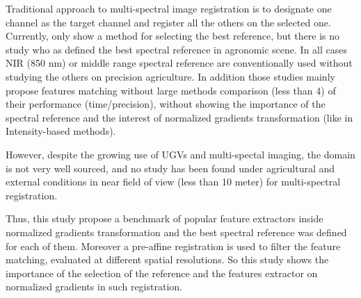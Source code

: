 \documentclass[../thesis.tex]{subfiles}
\begin{document}
	\par Traditional approach to multi-spectral image registration is to designate one channel as
	the target channel and register all the others on the selected one.
	Currently, only \cite{DantasDiasJunior} show a method for selecting the best reference,
	but there is no study who as defined the best spectral reference in agronomic scene.
	In all cases NIR (850 nm) or middle range spectral reference are conventionally used without studying the others on precision agriculture.
	In addition those studies mainly propose features matching without large methods comparison \cite{DantasDiasJunior}(less than 4) of their performance (time/precision),
	without showing the importance of the spectral reference and the interest of normalized gradients transformation (like in Intensity-based methods).
	
	\par However, despite the growing use of UGVs and multi-spectal imaging, the domain is not very well sourced,
	and no study has been found under agricultural and external conditions in near field of view (less than 10 meter) for multi-spectral registration.
	
	\par Thus, this study propose a benchmark of popular feature extractors inside normalized gradients transformation
	and the best spectral reference was defined for each of them.
	Moreover a pre-affine registration is used to filter the feature matching, evaluated at different spatial resolutions.
	So this study shows the importance of the selection of the reference and the features extractor on normalized gradients in such registration.
	
\end{document}
